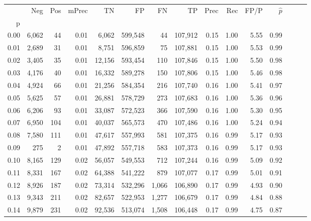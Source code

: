 \begin{tabular}{rrrrrrrrrrrrrrr}
\toprule
{} &     Neg &    Pos & mPrec &       TN &       FP &       FN &       TP &  Prec &   Rec &  FP/P & $\hat{p}$ \\
p    &         &        &       &          &          &          &          &       &       &       &           \\
\midrule
0.00 &   6,062 &     44 &  0.01 &    6,062 &  599,548 &       44 &  107,912 &  0.15 &  1.00 &  5.55 &      0.99 \\
0.01 &   2,689 &     31 &  0.01 &    8,751 &  596,859 &       75 &  107,881 &  0.15 &  1.00 &  5.53 &      0.99 \\
0.02 &   3,405 &     35 &  0.01 &   12,156 &  593,454 &      110 &  107,846 &  0.15 &  1.00 &  5.50 &      0.98 \\
0.03 &   4,176 &     40 &  0.01 &   16,332 &  589,278 &      150 &  107,806 &  0.15 &  1.00 &  5.46 &      0.98 \\
0.04 &   4,924 &     66 &  0.01 &   21,256 &  584,354 &      216 &  107,740 &  0.16 &  1.00 &  5.41 &      0.97 \\
0.05 &   5,625 &     57 &  0.01 &   26,881 &  578,729 &      273 &  107,683 &  0.16 &  1.00 &  5.36 &      0.96 \\
0.06 &   6,206 &     93 &  0.01 &   33,087 &  572,523 &      366 &  107,590 &  0.16 &  1.00 &  5.30 &      0.95 \\
0.07 &   6,950 &    104 &  0.01 &   40,037 &  565,573 &      470 &  107,486 &  0.16 &  1.00 &  5.24 &      0.94 \\
0.08 &   7,580 &    111 &  0.01 &   47,617 &  557,993 &      581 &  107,375 &  0.16 &  0.99 &  5.17 &      0.93 \\
0.09 &     275 &      2 &  0.01 &   47,892 &  557,718 &      583 &  107,373 &  0.16 &  0.99 &  5.17 &      0.93 \\
0.10 &   8,165 &    129 &  0.02 &   56,057 &  549,553 &      712 &  107,244 &  0.16 &  0.99 &  5.09 &      0.92 \\
0.11 &   8,331 &    167 &  0.02 &   64,388 &  541,222 &      879 &  107,077 &  0.17 &  0.99 &  5.01 &      0.91 \\
0.12 &   8,926 &    187 &  0.02 &   73,314 &  532,296 &    1,066 &  106,890 &  0.17 &  0.99 &  4.93 &      0.90 \\
0.13 &   9,343 &    211 &  0.02 &   82,657 &  522,953 &    1,277 &  106,679 &  0.17 &  0.99 &  4.84 &      0.88 \\
0.14 &   9,879 &    231 &  0.02 &   92,536 &  513,074 &    1,508 &  106,448 &  0.17 &  0.99 &  4.75 &      0.87 \\

\end{tabular}
